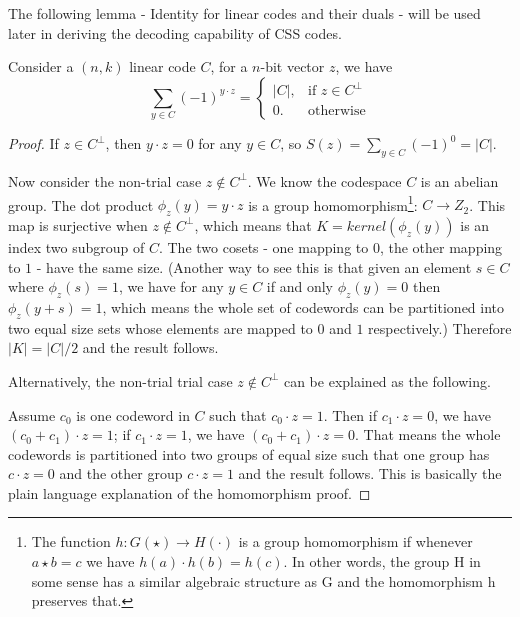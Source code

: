 The following lemma - Identity for linear codes and their duals - will be used later in deriving the decoding capability of CSS codes. 

\begin{lemma}
    Consider a \((n,k)\) linear code \(C\), for a \(n\)-bit vector \(z\), we have  
    \[
     \sum_{y \in C} (-1)^{y \cdot z} =
     \begin{cases}
    |C|, & \text{if } z \in C^{\perp} \\
    0.  & \text{otherwise}
    \end{cases}
    \]
\label{lemma:IdentityDual}
\end{lemma}

\begin{proof}
    If \(z \in C^{\perp}\), then \(y \cdot z = 0\) for any \(y \in C\), so \(S(z) = \sum_{y \in C} (-1)^0 = |C|. \)

    Now consider the non-trial case \(z \notin C^{\perp}\). We know the codespace \(C\) is an abelian group.  The dot product \(\phi_z(y) = y\cdot z\) is a group homomorphism\footnote{The function \(h : G(\star) \rightarrow H(\cdot)\) is a group homomorphism if whenever
\(a \star b = c\)  we have   \(h(a) \cdot h(b) = h(c).\)
In other words, the group H in some sense has a similar algebraic structure as G and the homomorphism h preserves that.
}: \(C \rightarrow Z_2\). This map is surjective when \(z \notin C^{\perp}\), which means that \(K = kernel(\phi_z(y))\) is an index two  subgroup of \(C\). The two cosets - one mapping to \(0\), the other mapping to \(1\) - have the same size. (Another way to see this is that given an element \(s \in C\) where \(\phi_z(s) = 1\), we have for any \(y \in C\) if and only \(\phi_z(y) = 0\) then \(\phi_z(y + s) = 1\), which means the whole set of codewords can be partitioned into two equal size sets whose elements are mapped to \(0\) and \(1\) respectively.) Therefore \(|K|=|C|/2\) and the result follows.

    Alternatively, the non-trial trial case \(z \notin C^{\perp}\) can be explained as the following.

    Assume \(c_0\) is one codeword in \(C\) such that \(c_0 \cdot z = 1\). Then if \(c_1\cdot z = 0\), we have \((c_0 + c_1)\cdot z = 1\);
    if \(c_1\cdot z = 1\), we have \((c_0 + c_1)\cdot z = 0\). That means the whole codewords is partitioned into two groups of equal size such that one group has \(c\cdot z = 0\) and the other group \(c \cdot z =1\) and the result follows.
    This is basically the plain language explanation of the homomorphism proof.
\end{proof}


